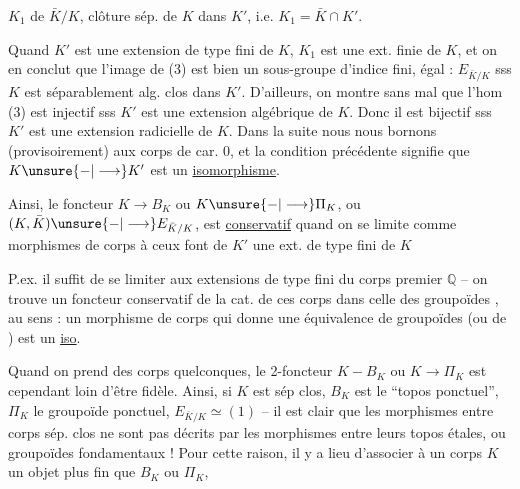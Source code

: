 
$K_1$ de $\bar K/K$, clôture  sép. de $K$ dans $K'$, i.e. $K_1=\bar K\cap K'$.

Quand $K'$ est une extension de type fini de $K$, $K_1$ est une ext. finie de $K$, et on en conclut que l'image de (3) est bien un sous-groupe d'indice fini, égal : $E_{\bar K/K}$ sss  $K$ est séparablement alg. clos dans $K'$. D'ailleurs, on montre sans mal que  l'hom (3) est injectif sss $K'$ est une extension algébrique de $K$. Donc il est bijectif sss $K'$ est une extension radicielle de $K$. Dans la suite nous nous bornons (provisoirement) aux corps de car. $0$, et la condition précédente signifie  que $K\unsure{-|\longrightarrow}K'$ est un \uline{isomorphisme}.

Ainsi, le foncteur $K\longrightarrow B_K$ ou $K\unsure{-|\longrightarrow}\Pi_K$, ou $(K,\bar K)\unsure{-|\longrightarrow}E_{\bar K/K}$, est \uline{conservatif} quand on se limite comme morphismes de corps  à ceux   font de $K'$ une ext. de type fini de $K$

P.ex. il suffit de se limiter aux extensions de type fini du corps premier $\mathbb{Q}$ -- on trouve un foncteur conservatif de la cat. de ces corps dans celle des groupoïdes , au sens : un morphisme de corps qui donne une équivalence de groupoïdes (ou de ) est un \uline{iso}.


Quand on prend des corps quelconques, le 2-foncteur $K-B_K$ ou $K\longrightarrow\Pi_K$  est cependant loin d'être fidèle. Ainsi, si $K$ est sép clos, $B_K$ est le ``topos ponctuel'', $\Pi_K$ le groupoïde ponctuel, $E_{\bar K/K}\simeq(1)$ -- il est clair que les morphismes entre corps sép. clos ne sont pas décrits par les morphismes entre leurs topos étales, ou groupoïdes fondamentaux ! Pour cette raison, il y a lieu d'associer à un corps $K$ un objet plus fin que $B_K$ ou $\Pi_K$,

